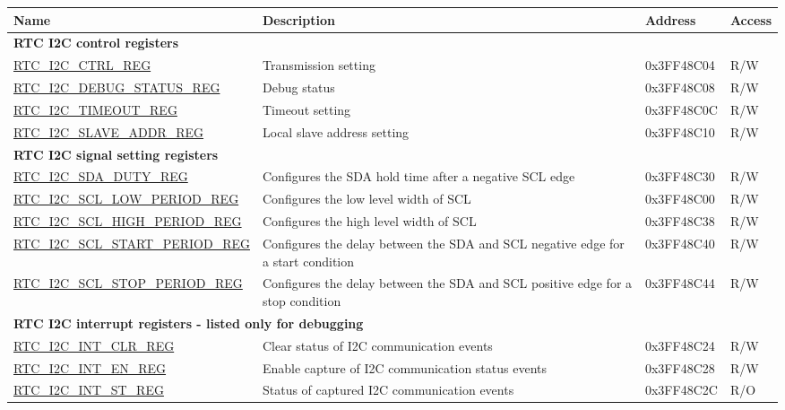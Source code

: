 \begin{longtable}{ |m{6cm} |m{6.5cm} | m{2cm} | m{1cm} | }
    \hline\rowcolor{lightgray}
    Name & Description &  Address & Access \\ \hline
    \multicolumn{4}{|l|}{\textbf{RTC I2C control registers}} \\ \hline
    \hyperref[regdesc:RTCI2CCTRLREG]{RTC\_I2C\_CTRL\_REG} & Transmission setting & 0x3FF48C04 & R/W \\ \hline
    \hyperref[regdesc:RTCI2CDEBUGSTATUSREG]{RTC\_I2C\_DEBUG\_STATUS\_REG} & Debug status & 0x3FF48C08 & R/W \\ \hline
    \hyperref[regdesc:RTCI2CTIMEOUTREG]{RTC\_I2C\_TIMEOUT\_REG} & Timeout setting & 0x3FF48C0C & R/W \\ \hline
    \hyperref[regdesc:RTCI2CSLAVEADDRREG]{RTC\_I2C\_SLAVE\_ADDR\_REG} & Local slave address setting & 0x3FF48C10 & R/W \\ \hline
    \multicolumn{4}{|l|}{\textbf{RTC I2C signal setting registers}} \\ \hline
    \hyperref[regdesc:RTCI2CSDADUTYREG]{RTC\_I2C\_SDA\_DUTY\_REG} & Configures the SDA hold time after a negative SCL edge & 0x3FF48C30 & R/W\\ \hline
    \hyperref[regdesc:RTCI2CSCLLOWPERIODREG]{RTC\_I2C\_SCL\_LOW\_PERIOD\_REG} & Configures the low level width of SCL & 0x3FF48C00 & R/W \\ \hline
    \hyperref[regdesc:RTCI2CSCLHIGHPERIODREG]{RTC\_I2C\_SCL\_HIGH\_PERIOD\_REG} & Configures the high level width of SCL & 0x3FF48C38 & R/W \\ \hline
    \hyperref[regdesc:RTCI2CSCLSTARTPERIODREG]{RTC\_I2C\_SCL\_START\_PERIOD\_REG} & Configures the delay between the SDA and SCL negative edge for a start condition & 0x3FF48C40 & R/W \\ \hline
    \hyperref[regdesc:RTCI2CSCLSTOPPERIODREG]{RTC\_I2C\_SCL\_STOP\_PERIOD\_REG} & Configures the delay between the SDA and SCL positive edge for a stop condition & 0x3FF48C44 & R/W \\ \hline
    \multicolumn{4}{|l|}{\textbf{RTC I2C interrupt registers - listed only for debugging}} \\ \hline
    \hyperref[regdesc:RTCI2CINTCLRREG]{RTC\_I2C\_INT\_CLR\_REG} & Clear status of I2C communication events & 0x3FF48C24 & R/W \\ \hline
    \hyperref[regdesc:RTCI2CINTENREG]{RTC\_I2C\_INT\_EN\_REG} & Enable capture of I2C communication status events & 0x3FF48C28 & R/W \\ \hline
    \hyperref[regdesc:RTCI2CINTSTREG]{RTC\_I2C\_INT\_ST\_REG} & Status of captured I2C communication events & 0x3FF48C2C & R/O \\ \hline
    \end{longtable}
    